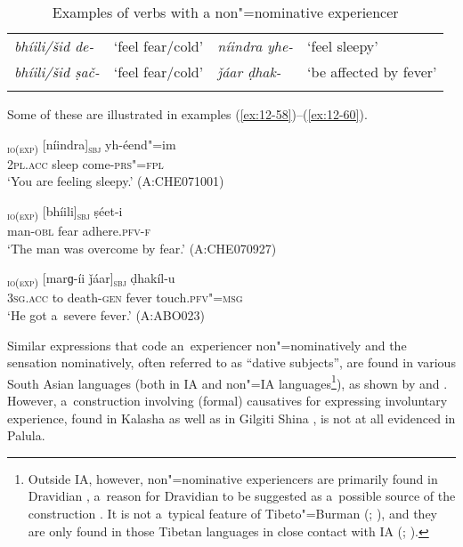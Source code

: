 \begin{table}[H]
\caption{Examples of verbs with a non"=nominative experiencer}
\begin{tabularx}{\textwidth}{ Q Q Q Q }
\lsptoprule
\textit{bhíili/šid de-} &
`feel fear/cold' &
\textit{níindra yhe-} &
`feel sleepy'\\
\textit{bhíili/šid ṣač-} &
`feel fear/cold' &
\textit{ǰáar ḍhak-} &
`be affected by fever'\\\lspbottomrule
\end{tabularx}
\label{tab:12-nnom}
\end{table}


Some of these are illustrated in examples (\ref{ex:12-58})--(\ref{ex:12-60}).

\begin{exe}
\ex
\label{ex:12-58}
\gll [tusaám]\textsubscript{\textsc{io(exp)}} [níindra]\textsubscript{\textsc{sbj}} yh-éend"=im \\
\textsc{2pl.acc} sleep come-\textsc{prs"=fpl} \\
\glt `You are feeling sleepy.' (A:CHE071001)

\ex
\label{ex:12-59}
\gll [míiš-a]\textsubscript{\textsc{io(exp)}} [bhíili]\textsubscript{\textsc{sbj}}
ṣéet-i \\
man-\textsc{obl} fear adhere.\textsc{pfv-f} \\
\glt `The man was overcome by fear.' (A:CHE070927)

\ex
\label{ex:12-60}
\textsubscript{\textsc{ io(exp)}} [marɡ-íi ǰáar]\textsubscript{\textsc{sbj}} ḍhakíl-u \\
3\textsc{sg.acc} to death-\textsc{gen} fever touch.\textsc{pfv"=msg} \\
\glt `He got a~severe fever.' (A:ABO023)
\end{exe}

Similar expressions that code an~experiencer non"=nominatively and the sensation nominatively, often referred to as ``dative subjects'', are found in various South Asian languages (both in IA and non"=IA languages\footnote{Outside IA, however, non"=nominative experiencers are primarily found in Dravidian \citep[260--263]{abbi1990}, a~reason for Dravidian to be suggested as a~possible source of the construction \citep[136]{hock1990}. It is not a~typical feature of Tibeto"=Burman (\citealt[260]{abbi1990}; \citealt[82]{bickel2004}), and they are only found in those Tibetan languages in close contact with IA (\citealt[83, 88]{bickel2004}; \citealt[8--9]{noonan2003}).}), as shown by \citet[326--330]{hook1990b} and \citet[256--263]{abbi1990}. However, a~construction involving (formal) causatives for expressing involuntary experience, found in Kalasha \citep[310]{bashir1990} as well as in Gilgiti Shina \citep{hookzia2005}, is not at all evidenced in Palula. 



